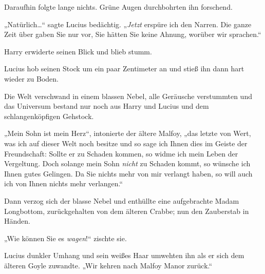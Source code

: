 Daraufhin folgte lange nichts. Grüne Augen durchbohrten ihn forschend.

„Natürlich…“ sagte Lucius bedächtig. „\emph{Jetzt} erspüre ich den Narren. Die ganze Zeit über gaben Sie nur vor, Sie hätten Sie keine Ahnung, worüber wir sprachen.“

Harry erwiderte seinen Blick und blieb stumm.

Lucius hob seinen Stock um ein paar Zentimeter an und stieß ihn dann hart wieder zu Boden.

Die Welt verschwand in einem blassen Nebel, alle Geräusche verstummten und das Universum bestand nur noch aus Harry und Lucius und dem schlangenköpfigen Gehstock.

„Mein Sohn ist mein Herz“, intonierte der ältere Malfoy, „das letzte von Wert, was ich auf dieser Welt noch besitze und so sage ich Ihnen dies im Geiste der Freundschaft: Sollte er zu Schaden kommen, so widme ich mein Leben der Vergeltung. Doch solange mein Sohn \emph{nicht} zu Schaden kommt, so wünsche ich Ihnen gutes Gelingen. Da Sie nichts mehr von mir verlangt haben, so will auch ich von Ihnen nichts mehr verlangen.“

Dann verzog sich der blasse Nebel und enthüllte eine aufgebrachte Madam Longbottom, zurückgehalten von dem älteren Crabbe; nun den Zauberstab in Händen.

„Wie können Sie es \emph{wagen}!“ zischte sie.

Lucius dunkler Umhang und sein weißes Haar umwehten ihn als er sich dem älteren Goyle zuwandte. „Wir kehren nach Malfoy Manor zurück.“

